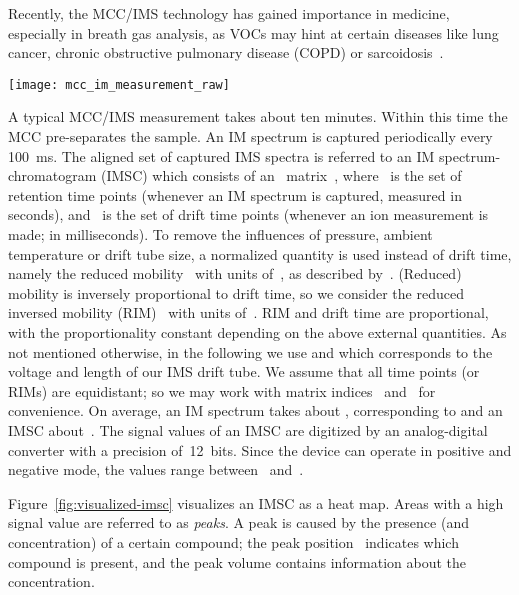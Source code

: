 \documentclass{article}
\begin{document}
Recently, the MCC/IMS technology has gained importance in medicine, especially in breath gas analysis, as VOCs may hint at certain diseases like lung cancer, chronic obstructive pulmonary disease (COPD) or sarcoidosis~\citep{Westhoff/etal/2009a, bodeker2008peakcomp, bunkowski/etal/2009a, westhoff2010differentiation}.


\begin{figure*}[t]\centering
\texttt{[image: mcc\_im\_measurement\_raw]}
\caption{
Visualization of a raw IMSC as a heat map.
X-axis: reduced inverse mobility  in ; 
y-axis: retention time~ in seconds; 
signal: white (lowest)  blue  purple  red  yellow (highest), reactant ion peak (RIP) at .
}
\label{fig:visualized-imsc}
\end{figure*}

A typical MCC/IMS measurement takes about ten minutes.
Within this time the MCC pre-separates the sample.
An IM spectrum is captured periodically every 100~ms.
The aligned set of captured IMS spectra is referred to an IM spectrum-chromatogram (IMSC) which consists of an~ matrix~, where~ is the set of retention time points (whenever an IM spectrum is captured, measured in seconds), and~ is the set of drift time points (whenever an ion measurement is made; in milliseconds).
To remove the influences of pressure, ambient temperature or drift tube size, a normalized quantity is used instead of drift time, namely the reduced mobility~ with units of~, as described by~\cite{eiceman/2010a}.
(Reduced) mobility is inversely proportional to drift time, so we consider the reduced inversed mobility (RIM)~ with units of~.
RIM and drift time are proportional, with the proportionality constant depending on the above external quantities.
As not mentioned otherwise, in the following we use  and  which corresponds to the voltage and length of our IMS drift tube.
We assume that all time points (or RIMs) are equidistant; 
so we may work with matrix indices~ and~ for convenience.
On average, an IM spectrum takes about , corresponding to  and an IMSC about~.
The signal values of an IMSC are digitized by an analog-digital converter with a precision of~12~bits.
Since the device can operate in positive and negative mode, the values range between~ and~.

Figure~\ref{fig:visualized-imsc} visualizes an IMSC as a heat map.
Areas with a high signal value are referred to as \emph{peaks}.
A peak is caused by the presence (and concentration) of a certain compound; the peak position~ indicates which compound is present, and the peak volume contains information about the concentration.
\end{document}
